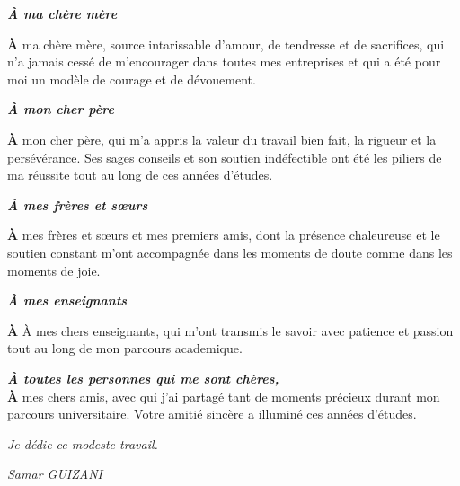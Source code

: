 \documentclass[12pt, oneside, a4paper]{report}
\begin{document}
\begin{center}
\textit{\textbf{À ma chère mère}}

{\Huge\textbf{À}} ma chère mère, source intarissable d'amour, de tendresse et de sacrifices, qui n'a jamais cessé de m'encourager dans toutes mes entreprises et qui a été pour moi un modèle de courage et de dévouement.

\end{center}
\begin{center}
\textit{\textbf{À mon cher père}}

{\Huge\textbf{À}} mon cher père, qui m'a appris la valeur du travail bien fait, la rigueur et la persévérance. Ses sages conseils et son soutien indéfectible ont été les piliers de ma réussite tout au long de ces années d'études.


\end{center}

\begin{center}
\textit{\textbf{À mes frères et sœurs}}


{\Huge\textbf{À}} mes frères et sœurs et mes premiers amis, dont la présence chaleureuse et le soutien constant m'ont accompagnée dans les moments de doute comme dans les moments de joie.


\end{center}

\begin{center}
\textit{\textbf{À mes enseignants}}


{\Huge\textbf{À}} À mes chers enseignants, qui m'ont transmis le savoir avec patience et passion tout au long de mon parcours academique.


\end{center}

\begin{center}
\textit{\textbf{À toutes les personnes qui me sont chères,}}\\

{\Huge\textbf{À}} mes chers amis, avec qui j'ai partagé tant de moments précieux durant mon parcours universitaire. Votre amitié sincère a illuminé ces années d'études.



\textit{Je dédie ce modeste travail.}
\end{center}

\vspace{1cm}

\begin{flushright}
\textit{Samar GUIZANI}

\end{flushright}
\clearpage
\thispagestyle{plain}
\end{document}
